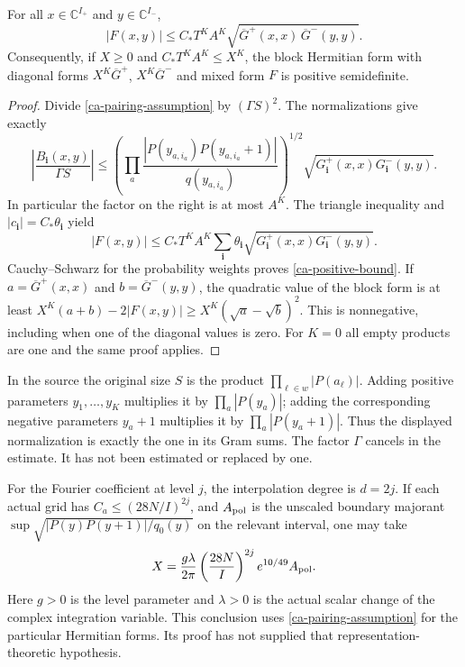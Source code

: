 \begin{proposition}\label{ca-positive-block}
For all $x\in\mathbb C^{I_+}$ and $y\in\mathbb C^{I_-}$,
\begin{equation}\label{ca-positive-bound}
 |F(x,y)|\leq C_*T^KA^K
       \sqrt{\overline G^+(x,x)\,\overline G^-(y,y)}.
\end{equation}
Consequently, if $X\geq0$ and
$C_*T^KA^K\leq X^K$, the block Hermitian form with
diagonal forms $X^K\overline G^+$, $X^K\overline G^-$
and mixed form $F$ is positive semidefinite.
\end{proposition}

\begin{proof}
Divide \eqref{ca-pairing-assumption} by $(\Gamma S)^2$.
The normalizations give exactly
\[
 \left|\frac{B_{\boldsymbol i}(x,y)}{\Gamma S}\right|
 \leq
 \left(\prod_a
       \frac{|P(y_{a,i_a})P(y_{a,i_a}+1)|}{q(y_{a,i_a})}
       \right)^{1/2}
       \sqrt{G^+_{\boldsymbol i}(x,x)
                         G^-_{\boldsymbol i}(y,y)}.
\]
In particular the factor on the right is at most $A^K$.
The triangle inequality and
$|c_{\boldsymbol i}|=C_*\theta_{\boldsymbol i}$ yield
\[
 |F(x,y)|\leq C_*T^KA^K
     \sum_{\boldsymbol i}\theta_{\boldsymbol i}
          \sqrt{G^+_{\boldsymbol i}(x,x)
                            G^-_{\boldsymbol i}(y,y)}.
\]
Cauchy--Schwarz for the probability weights proves
\eqref{ca-positive-bound}.
If $a=\overline G^+(x,x)$ and
$b=\overline G^-(y,y)$, the quadratic value of the block
form is at least
$X^K(a+b)-2|F(x,y)|\geq X^K(\sqrt a-\sqrt b)^2$.
This is nonnegative, including when one of the diagonal
values is zero.  For $K=0$ all empty products are one and
the same proof applies.
\end{proof}

In the source the original size $S$ is the product
$\prod_{\ell\in w}|P(a_\ell)|$.
Adding positive parameters $y_1,\ldots,y_K$ multiplies it by
$\prod_a|P(y_a)|$; adding the corresponding negative
parameters $y_a+1$ multiplies it by
$\prod_a|P(y_a+1)|$.  Thus the displayed normalization is
exactly the one in its Gram sums.  The factor $\Gamma$
cancels in the estimate.  It has not been estimated or
replaced by one.

For the Fourier coefficient at level $j$, the interpolation
degree is $d=2j$.  If each actual grid has
$C_a\leq(28N/I)^{2j}$, and $A_{\rm pol}$ is the unscaled
boundary majorant
$\sup\sqrt{|P(y)P(y+1)|/q_0(y)}$ on the relevant interval,
one may take
\begin{equation}\label{ca-X-exact}
 X=\frac{g\lambda}{2\pi}
         \left(\frac{28N}{I}\right)^{2j}
                         e^{10/49}A_{\rm pol}.
\end{equation}
Here $g>0$ is the level parameter and $\lambda>0$ is the
actual scalar change of the complex integration variable.
This conclusion uses \eqref{ca-pairing-assumption} for the
particular Hermitian forms.  Its proof has not supplied
that representation-theoretic hypothesis.

